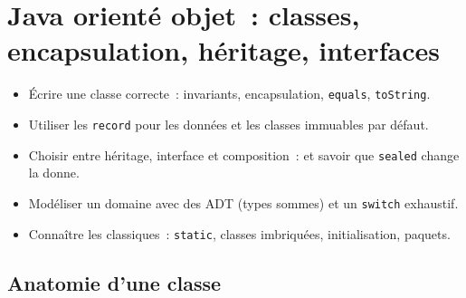 \documentclass[12pt,a4paper,twoside,openright]{book}
\begin{document}
\chapter{Java orient\'e objet~: classes, encapsulation, h\'eritage, interfaces}
\label{ch-java-oop}

\begin{objectif}
\begin{itemize}
  \item \'Ecrire une classe correcte~: invariants, encapsulation, \verb|equals|, \verb|toString|.
  \item Utiliser les \verb|record| pour les donn\'ees et les classes immuables par d\'efaut.
  \item Choisir entre h\'eritage, interface et composition~: et savoir que \verb|sealed| change la donne.
  \item Mod\'eliser un domaine avec des ADT (types sommes) et un \verb|switch| exhaustif.
  \item Conna\^itre les classiques~: \verb|static|, classes imbriqu\'ees, initialisation, paquets.
\end{itemize}
\end{objectif}

\section{Anatomie d'une classe}
\end{document}
